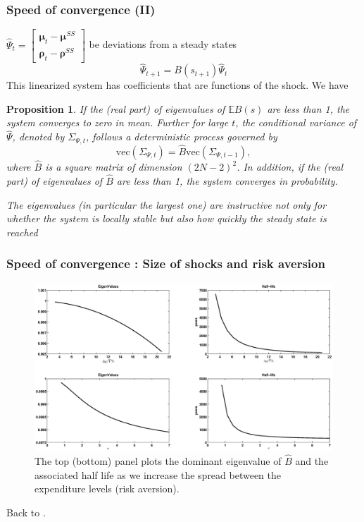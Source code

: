 \documentclass{beamer}
\newcommand{\bmat}{\begin{matrix}}
\newcommand{\emat}{\end{matrix}}
\newtheorem{proposition}{Proposition}
\begin{document}
\begin{frame}
\frametitle{Speed of convergence  (II) }
 $\hat{\Psi}_{t}= \left[\bmat \bm{\mu}_{t} - \bm{\mu}^{SS}\\ \bm \rho_t - \bm \rho^{SS}\emat\right]$ be  deviations from a steady states
\begin{equation*}
 \hat{\Psi}_{t+1}=B(s_{t+1})\hat{\Psi}_t
\end{equation*}
This linearized system has coefficients that are functions of the shock. 
\small
We have 
\begin{proposition}\label{prop: localstability}
If the (real part) of eigenvalues of $\mathbb{E}B(s)$ are less than 1,  the system  converges to zero  in mean. Further for large $t$, the conditional variance of $\hat{\Psi}$, denoted by $\Sigma_{\Psi,t}$, follows a deterministic process governed by
\[\text{vec}(\Sigma_{\Psi,t})=\hat{B} \text{vec}(\Sigma_{\Psi,t-1}),\]	
where $\hat{B}$ is a square matrix of dimension $(2N-2)^2$. In addition,  if the (real part) of eigenvalues of $\hat{B}$ are less than 1, the system converges in probability.
\end{proposition}

\color{red}\emph{The eigenvalues (in particular the largest one) are instructive not only for whether the system is locally stable but also how quickly the steady state is reached}

\end{frame}

\begin{frame}
\frametitle{Speed of convergence : Size of shocks and risk aversion}
  \begin{figure}[htp]
 \centering
 \includegraphics[width=\textwidth]{Draft25Graphs/eigenvalues.eps}
 \caption{The top (bottom) panel plots the dominant eigenvalue of $\hat{B}$ and the associated half life as we increase
the spread between the expenditure levels (risk aversion). }
 \label{fig: Eigenvalues}
 \end{figure}
 Back to \hyperlink{main}{}.
 \end{frame}
 
\end{document}
